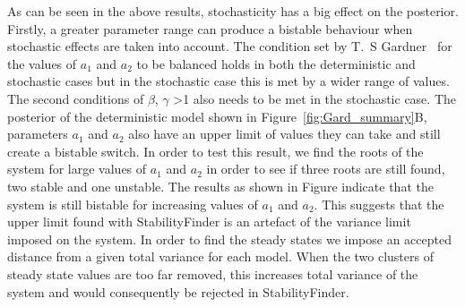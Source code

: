 %
\clearpage
As can be seen in the above results, stochasticity has a big effect on the posterior. Firstly, a greater parameter range can produce a bistable behaviour when stochastic effects are taken into account. The condition set by T.~S Gardner~\autocite{Gardner:2000vha} for the values of $a_1$ and $a_2$ to be balanced holds in both the deterministic and stochastic cases but in the stochastic case this is met by a wider range of values. The second conditions of $\beta$, $\gamma$ \textgreater 1 also needs to be met in the stochastic case. The posterior of the deterministic model shown in Figure~\ref{fig:Gard_summary}B, parameters $a_1$ and $a_2$ also have an upper limit of values they can take and still create a bistable switch. In order to test this result, we find the roots of the system for large values of  $a_1$ and $a_2$ in order to see if three roots are still found, two stable and one unstable. The results as shown in Figure indicate that the system is still bistable for increasing values of $a_1$ and $a_2$. This suggests that the upper limit found with StabilityFinder is an artefact of the variance limit imposed on the system. In order to find the steady states we impose an accepted distance from a given total variance for each model. When the two clusters of steady state values are too far removed, this increases total variance of the system and would consequently be rejected in StabilityFinder.

